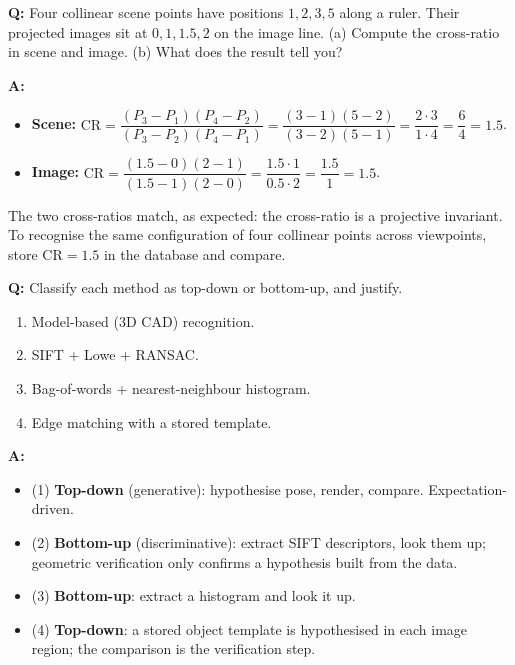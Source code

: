 \begin{exbox}
\textbf{Q:} Four collinear scene points have positions $1, 2, 3, 5$ along a ruler. Their projected images sit at $0, 1, 1.5, 2$ on the image line. (a) Compute the cross-ratio in scene and image. (b) What does the result tell you?

\textbf{A:}
\begin{itemize}
  \item \textbf{Scene:} $\mathrm{CR} = \dfrac{(P_3 - P_1)(P_4 - P_2)}{(P_3 - P_2)(P_4 - P_1)} = \dfrac{(3-1)(5-2)}{(3-2)(5-1)} = \dfrac{2 \cdot 3}{1 \cdot 4} = \dfrac{6}{4} = 1.5$.
  \item \textbf{Image:} $\mathrm{CR} = \dfrac{(1.5 - 0)(2 - 1)}{(1.5 - 1)(2 - 0)} = \dfrac{1.5 \cdot 1}{0.5 \cdot 2} = \dfrac{1.5}{1} = 1.5$.
\end{itemize}
The two cross-ratios match, as expected: the cross-ratio is a projective invariant. To recognise the same configuration of four collinear points across viewpoints, store $\mathrm{CR} = 1.5$ in the database and compare.
\end{exbox}

\begin{exbox}
\textbf{Q:} Classify each method as top-down or bottom-up, and justify.
\begin{enumerate}
  \item Model-based (3D CAD) recognition.
  \item SIFT + Lowe + RANSAC.
  \item Bag-of-words + nearest-neighbour histogram.
  \item Edge matching with a stored template.
\end{enumerate}

\textbf{A:}
\begin{itemize}
  \item (1) \textbf{Top-down} (generative): hypothesise pose, render, compare. Expectation-driven.
  \item (2) \textbf{Bottom-up} (discriminative): extract SIFT descriptors, look them up; geometric verification only confirms a hypothesis built from the data.
  \item (3) \textbf{Bottom-up}: extract a histogram and look it up.
  \item (4) \textbf{Top-down}: a stored object template is hypothesised in each image region; the comparison is the verification step.
\end{itemize}
\end{exbox}

